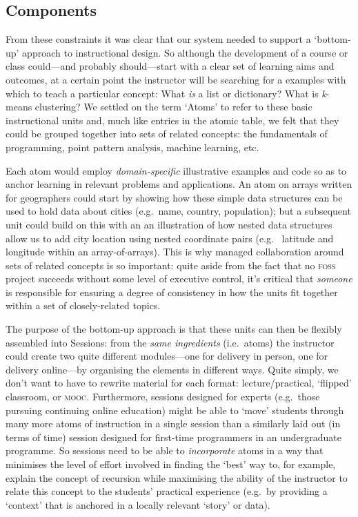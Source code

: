 \documentclass[letter, 11pt]{article}
\newcommand{\eg}{e.g.~\/}
\newcommand{\ie}{i.e.~\/}
\begin{document}
\subsection{Components}\label{components}

From these constraints it was clear that our system needed to support a
`bottom-up' approach to instructional design. So although the development of a
course or class could---and probably should---start with a clear set of learning
aims and outcomes, at a certain point the instructor will be searching for a
examples with which to teach a particular concept: What \emph{is} a list or
dictionary? What is \textit{k}-means clustering? We settled on the term `Atoms'
to refer to these basic instructional units and, much like entries in the atomic
table, we felt that they could be grouped together into sets of related
concepts: the fundamentals of programming, point pattern analysis, machine
learning, etc.

Each atom would employ \emph{domain-specific} illustrative examples and code so
as to anchor learning in relevant problems and applications. An atom on arrays
written for geographers could start by showing how these simple data structures
can be used to hold data about cities (\eg name, country, population); but a
subsequent unit could build on this with an an illustration of how nested data
structures allow us to add city location using nested coordinate pairs (\eg
latitude and longitude within an array-of-arrays). This is why managed
collaboration around sets of related concepts is so important: quite aside from
the fact that no \textsc{foss} project succeeds without some level of executive
control, it's critical that \textit{someone} is responsible for ensuring a
degree of consistency in how the units fit together within a set of
closely-related topics.

The purpose of the bottom-up approach is that these units can then be flexibly
assembled into Sessions: from the \textit{same ingredients} (\ie atoms) the
instructor could create two quite different modules---one for delivery in
person, one for delivery online---by organising the elements in different ways.
Quite simply, we don't want to have to rewrite material for each format:
lecture/practical, `flipped' classroom, or \textsc{mooc}. Furthermore, sessions
designed for experts (\eg those pursuing continuing online education) might be
able to `move' students through many more atoms of instruction in a single
session than a similarly laid out (in terms of time) session designed for
first-time programmers in an undergraduate programme. So sessions need to be
able to \emph{incorporate} atoms in a way that minimises the level of effort
involved in finding the `best' way to, for example, explain the concept of
recursion while maximising the ability of the instructor to relate this concept
to the students' practical experience (\eg by providing a `context' that is
anchored in a locally relevant `story' or data).
\end{document}
